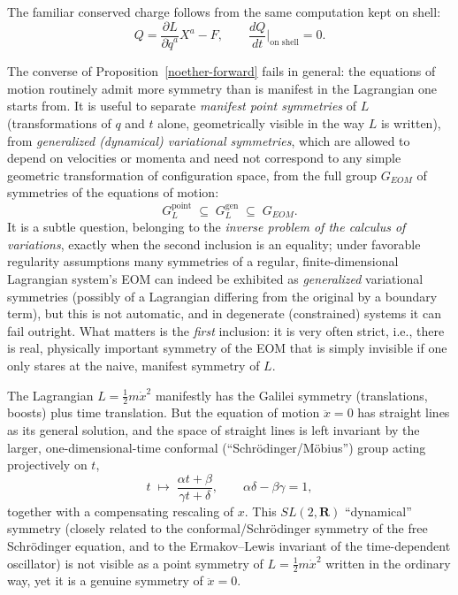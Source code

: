 The familiar conserved charge follows from the same computation kept on shell:
\[
Q = \frac{\partial L}{\partial \dot q^a} X^a - F, 
\qquad \frac{dQ}{dt}\Big|_{\text{on shell}} = 0 .
\]

The converse of Proposition~\ref{noether-forward} fails in general: the
equations of motion routinely admit more symmetry than is manifest in the
Lagrangian one starts from. It is useful to separate \emph{manifest point
symmetries} of $L$ (transformations of $q$ and $t$ alone, geometrically visible
in the way $L$ is written), from \emph{generalized (dynamical) variational
symmetries}, which are allowed to depend on velocities or momenta and need not
correspond to any simple geometric transformation of configuration space, from
the full group $G_{EOM}$ of symmetries of the equations of motion:
\[
G_L^{\text{point}} \;\subseteq\; G_L^{\text{gen}} \;\subseteq\; G_{EOM} .
\]
It is a subtle question, belonging to the \emph{inverse problem of the calculus
of variations}, exactly when 
the second inclusion is an equality; under
favorable regularity assumptions many symmetries of a regular,
finite-dimensional Lagrangian system's EOM can indeed be exhibited as
\emph{generalized} variational symmetries (possibly of a Lagrangian differing
from the original by a boundary term), but this is not automatic, and 
in degenerate (constrained) systems it can fail outright. What
matters  is the \emph{first} inclusion: it is very
often strict, i.e., there is real, physically important symmetry of the EOM
that is simply invisible if one only stares at the naive, manifest symmetry of
$L$.

\begin{example}
The Lagrangian $L=\tfrac12 m\dot x^2$ manifestly has the Galilei symmetry
    (translations, boosts) plus time translation. But the equation of motion
    $\ddot x=0$ has straight lines as its general solution, and the space of
    straight lines is left invariant by the larger, one-dimensional-time
    conformal (``Schr\"odinger/M\"obius'') group acting projectively on $t$,
\[
t \;\longmapsto\; \frac{\alpha t+\beta}{\gamma t+\delta},
    \qquad \alpha\delta-\beta\gamma=1,
\]
together with a compensating rescaling of $x$. This $SL(2,\mathbf R)$ ``dynamical''
    symmetry (closely related to the conformal/Schr\"odinger symmetry of the
    free Schr\"odinger equation, and to the Ermakov--Lewis invariant of the
    time-dependent oscillator) is not visible as a point symmetry of
    $L=\tfrac12 m\dot x^2$ written in the ordinary way, yet it is a genuine
    symmetry of $\ddot x=0$.
\end{example}

